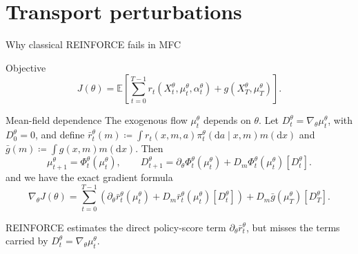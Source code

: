 \documentclass[9pt]{beamer}
\def\E{{\mathbb E}}
\def\d{{\mathrm d}}
\newcommand{\bad}[1]{\textcolor{Xred}{#1}}
\begin{document}
\section{Transport perturbations}
\begin{frame}{Why classical REINFORCE fails in MFC}
\begin{block}{Objective}
\[
J(\theta)=\E\left[\sum_{t=0}^{T-1}r_t(X_t^\theta,\mu_t^\theta,\alpha_t^\theta)
+g(X_T^\theta,\mu_T^\theta)\right].
\]
\end{block}

\begin{block}{Mean-field dependence}
The exogenous flow $\mu_t^\theta$ depends on $\theta$.
Let $D_t^\theta=\nabla_\theta\mu_t^\theta$, with $D_0^\theta=0$, and define $\bar r_t^\theta(m)\coloneqq\int r_t(x,m,a)\pi_t^\theta(\d a\mid x,m)m(\d x)$ and $\bar g(m)\coloneqq\int g(x,m)m(\d x)$. Then
  \[
  \mu_{t+1}^\theta=\Phi_t^\theta(\mu_t^\theta),
  \qquad
  D_{t+1}^\theta
  =\partial_\theta\Phi_t^\theta(\mu_t^\theta)
  +D_m\Phi_t^\theta(\mu_t^\theta)[D_t^\theta].
\]
and we have the exact gradient formula
\[
  \nabla_\theta J(\theta)
  =\sum_{t=0}^{T-1}
  \left(\partial_\theta\bar r_t^\theta(\mu_t^\theta)
  +D_m\bar r_t^\theta(\mu_t^\theta)[D_t^\theta]\right)
  +D_m\bar g(\mu_T^\theta)[D_T^\theta].
\]
\end{block}

\bad{REINFORCE estimates the direct policy-score term
$\partial_\theta\bar r_t^\theta$, but misses the terms carried by
$D_t^\theta=\nabla_\theta\mu_t^\theta$.}

\end{frame}
\end{document}
